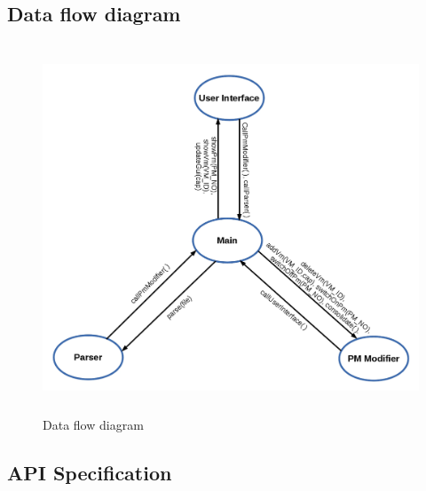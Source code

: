 \documentclass[a4paper,11pt]{article}
\begin{document}
\pagebreak
\subsection{Data flow diagram}

\begin{figure}[h]
\centering
\includegraphics[height=11cm]{images/dfd.jpg}
\caption{Data flow diagram}
\label{fig:modules}

\end{figure}




\subsection{API Specification}
\end{document}
